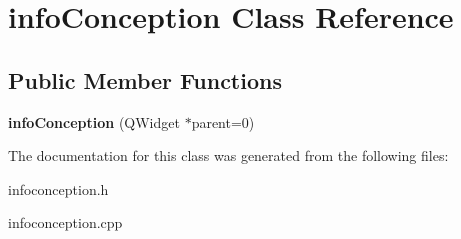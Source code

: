 \hypertarget{classinfo_conception}{\section{info\-Conception \-Class \-Reference}
\label{classinfo_conception}
}
\subsection*{\-Public \-Member \-Functions}
\begin{DoxyCompactItemize}
\item 
\hypertarget{classinfo_conception_ad0af95f8561abe473a437842ce287a56}{{\bfseries info\-Conception} (\-Q\-Widget $\ast$parent=0)}\label{classinfo_conception_ad0af95f8561abe473a437842ce287a56}

\end{DoxyCompactItemize}


\-The documentation for this class was generated from the following files\-:\begin{DoxyCompactItemize}
\item 
infoconception.\-h\item 
infoconception.\-cpp\end{DoxyCompactItemize}
